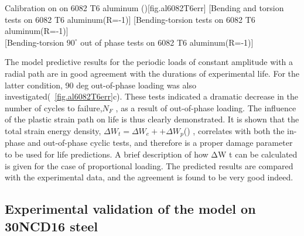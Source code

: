 \documentclass[3p,times,number,review]{elsarticle}
\newcommand{\figref}[1]{\figurename~\ref{#1}}
\begin{document}
\begin{Figure}[]{Calibration on on 6082 T6 aluminum (\cite{susmel2003multiaxial})}[fig.al6082T6err]
[Bending and torsion tests on 6082 T6 aluminum(R=-1)]
[Bending-torsion tests on 6082 T6 aluminum(R=-1)]
\\
[Bending-torsion $90^\circ$ out of phase tests on 6082 T6 aluminum(R=-1)]
\end{Figure}

The model predictive results for the periodic loads of constant amplitude with a radial path are in good agreement with the durations of experimental life. For the latter condition, 90 deg out-of-phase loading was also investigated(\figref{fig.al6082T6err}c). These tests indicated a dramatic decrease in the number of cycles to failure,$N_F$ , as a result of out-of-phase loading. The influence of the plastic strain path on life is thus clearly demonstrated. It is shown that the total strain energy density, $ΔW_t = ΔW_e+ + ΔW_p$(\cite{ellyin1991phase}) , correlates with both the in-phase and out-of-phase cyclic tests, and therefore is a proper damage parameter to be used for life predictions. A brief description of how ΔW t can be calculated is given for the case of proportional loading. The predicted results are compared with the experimental data, and the agreement is found to be very good indeed.



\clearpage
\subsection{Experimental validation of the model on 30NCD16 steel}
\end{document}
